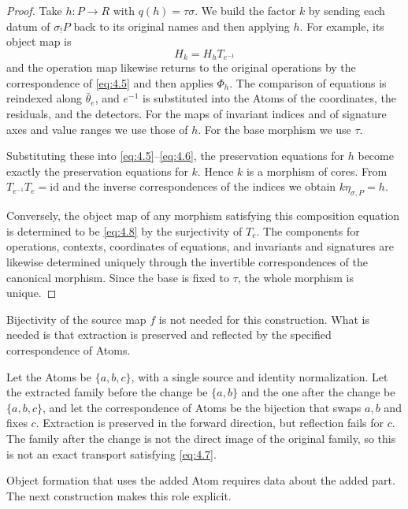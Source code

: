 \begin{proof}

Take $h:P\to R$ with $q(h)=\tau\sigma$.
We build the factor $k$ by sending each datum of $\sigma_!P$ back to its original names
and then applying $h$. For example, its object map is
\begin{equation*}
H_k=H_hT_{e^{-1}}
\tag{4.8}\label{eq:4.8}
\end{equation*}
and the operation map likewise returns to the original operations by the correspondence of
\eqref{eq:4.5} and then applies $\Phi_h$.
The comparison of equations is reindexed along $\bar\theta_e$, and $e^{-1}$ is substituted
into the Atoms of the coordinates, the residuals, and the detectors.
For the maps of invariant indices and of signature axes and value ranges we use those of
$h$. For the base morphism we use $\tau$.

Substituting these into \eqref{eq:4.5}--\eqref{eq:4.6}, the preservation equations for $h$
become exactly the preservation equations for $k$. Hence $k$ is a morphism of cores.
From $T_{e^{-1}}T_e=\mathrm{id}$ and the inverse correspondences of the indices we obtain
$k\eta_{\sigma,P}=h$.

Conversely, the object map of any morphism satisfying this composition equation is
determined to be \eqref{eq:4.8} by the surjectivity of $T_e$.
The components for operations, contexts, coordinates of equations, and invariants and
signatures are likewise determined uniquely through the invertible correspondences of the
canonical morphism.
Since the base is fixed to $\tau$, the whole morphism is unique.

\end{proof}

Bijectivity of the source map $f$ is not needed for this construction.
What is needed is that extraction is preserved and reflected by the specified
correspondence of Atoms.

\begin{example}\label{ex:4.6}

Let the Atoms be $\{a,b,c\}$, with a single source and identity normalization.
Let the extracted family before the change be $\{a,b\}$ and the one after the change be
$\{a,b,c\}$, and let the correspondence of Atoms be the bijection that swaps $a,b$ and
fixes $c$.
Extraction is preserved in the forward direction, but reflection fails for $c$.
The family after the change is not the direct image of the original family, so this is not
an exact transport satisfying \eqref{eq:4.7}.

Object formation that uses the added Atom requires data about the added part.
The next construction makes this role explicit.

\end{example}

